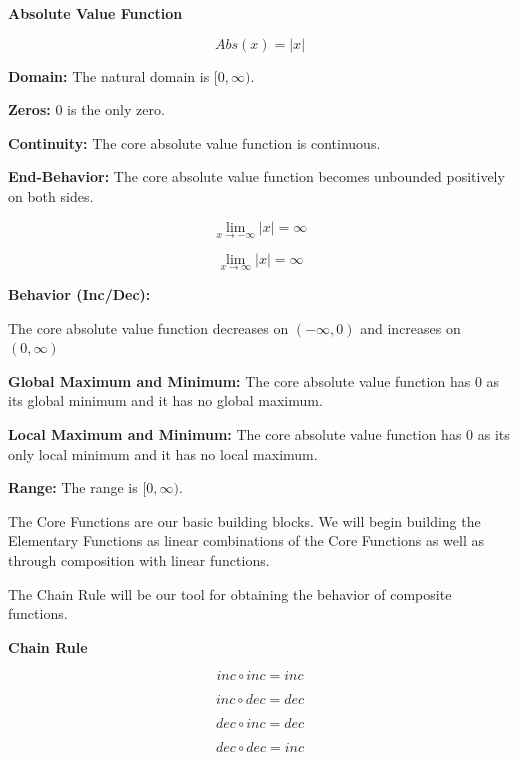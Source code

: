\documentclass{ximera}
\begin{document}
\begin{explanation} \textbf{\textcolor{red!75!green}{Absolute Value Function}} 


\[ Abs(x) = |x|  \]



\textbf{Domain:} The natural domain is $[0, \infty)$.

\textbf{Zeros:} $0$ is the only zero.




\textbf{Continuity:} The core absolute value function is continuous.

\textbf{End-Behavior:} The core absolute value function becomes unbounded positively on both sides.




\[
\lim\limits_{x \to -\infty} |x| = \infty
\]


\[
\lim\limits_{x \to \infty} |x| = \infty
\]






\textbf{Behavior (Inc/Dec):} 

The core absolute value function decreases on $(-\infty, 0)$ and increases on $(0, \infty)$







\textbf{Global Maximum and Minimum:} The core absolute value function has $0$ as its global minimum and it has no global maximum.




\textbf{Local Maximum and Minimum:}  The core absolute value function has $0$ as its only local minimum and it has no local maximum.



\textbf{Range:} The range is $[0, \infty)$.

\end{explanation}





The Core Functions are our basic building blocks.  We will begin building the Elementary Functions as linear combinations of the Core Functions as well as through composition with linear functions. 


The Chain Rule will be our tool for obtaining the behavior of composite functions.



\begin{theorem} \textbf{\textcolor{-red!75!green}{Chain Rule}} 

\[ inc \circ inc = inc \]

\[ inc \circ dec = dec \]

\[ dec \circ inc = dec \]

\[ dec \circ dec = inc \]

\end{theorem}
\end{document}
